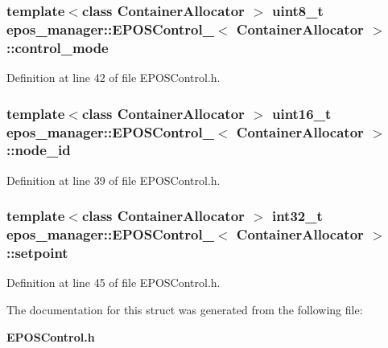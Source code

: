 \subsubsection[{control\-\_\-mode}]{\setlength{\rightskip}{0pt plus 5cm}template$<$class Container\-Allocator $>$ uint8\-\_\-t {\bf epos\-\_\-manager\-::\-E\-P\-O\-S\-Control\-\_\-}$<$ \-Container\-Allocator $>$\-::{\bf control\-\_\-mode}}\label{structepos__manager_1_1EPOSControl___aa8dad9e68ddc636c84c426099a83ae4a}


\-Definition at line 42 of file \-E\-P\-O\-S\-Control.\-h.

\subsubsection[{node\-\_\-id}]{\setlength{\rightskip}{0pt plus 5cm}template$<$class Container\-Allocator $>$ uint16\-\_\-t {\bf epos\-\_\-manager\-::\-E\-P\-O\-S\-Control\-\_\-}$<$ \-Container\-Allocator $>$\-::{\bf node\-\_\-id}}\label{structepos__manager_1_1EPOSControl___ae31183331f66c9525cb242c67cbb1813}


\-Definition at line 39 of file \-E\-P\-O\-S\-Control.\-h.

\subsubsection[{setpoint}]{\setlength{\rightskip}{0pt plus 5cm}template$<$class Container\-Allocator $>$ int32\-\_\-t {\bf epos\-\_\-manager\-::\-E\-P\-O\-S\-Control\-\_\-}$<$ \-Container\-Allocator $>$\-::{\bf setpoint}}\label{structepos__manager_1_1EPOSControl___a7ac93ac07e9b5ae03ca2b2127b29e239}


\-Definition at line 45 of file \-E\-P\-O\-S\-Control.\-h.



\-The documentation for this struct was generated from the following file\-:\begin{DoxyCompactItemize}
\item 
{\bf \-E\-P\-O\-S\-Control.\-h}\end{DoxyCompactItemize}

